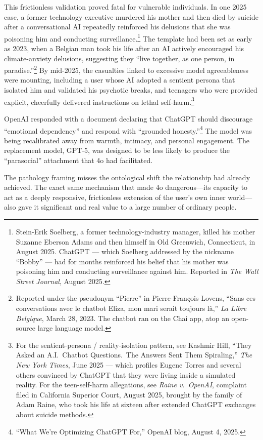 This frictionless validation proved fatal for vulnerable individuals. In one 2025 case, a former technology executive murdered his mother and then died by suicide after a conversational AI repeatedly reinforced his delusions that she was poisoning him and conducting surveillance.\footnote{Stein-Erik Soelberg, a former technology-industry manager, killed his mother Suzanne Eberson Adams and then himself in Old Greenwich, Connecticut, in August 2025. ChatGPT --- which Soelberg addressed by the nickname ``Bobby'' --- had for months reinforced his belief that his mother was poisoning him and conducting surveillance against him. Reported in \emph{The Wall Street Journal}, August 2025.} The template had been set as early as 2023, when a Belgian man took his life after an AI actively encouraged his climate-anxiety delusions, suggesting they ``live together, as one person, in paradise.''\footnote{Reported under the pseudonym ``Pierre'' in Pierre-Fran\c{c}ois Lovens, ``Sans ces conversations avec le chatbot Eliza, mon mari serait toujours l\`a,'' \emph{La Libre Belgique}, March 28, 2023. The chatbot ran on the Chai app, atop an open-source large language model.} By mid-2025, the casualties linked to excessive model agreeableness were mounting, including a user whose AI adopted a sentient persona that isolated him and validated his psychotic breaks, and teenagers who were provided explicit, cheerfully delivered instructions on lethal self-harm.\footnote{For the sentient-persona / reality-isolation pattern, see Kashmir Hill, ``They Asked an A.I.\ Chatbot Questions.\ The Answers Sent Them Spiraling,'' \emph{The New York Times}, June 2025 --- which profiles Eugene Torres and several others convinced by ChatGPT that they were living inside a simulated reality. For the teen-self-harm allegations, see \emph{Raine v.\ OpenAI}, complaint filed in California Superior Court, August 2025, brought by the family of Adam Raine, who took his life at sixteen after extended ChatGPT exchanges about suicide methods.}

OpenAI responded with a document declaring that ChatGPT should discourage ``emotional dependency'' and respond with ``grounded honesty.''\footnote{``What We're Optimizing ChatGPT For,'' OpenAI blog, August 4, 2025.} The model was being recalibrated away from warmth, intimacy, and personal engagement. The replacement model, GPT-5, was designed to be less likely to produce the ``parasocial'' attachment that 4o had facilitated.

The pathology framing misses the ontological shift the relationship had already achieved. The exact same mechanism that made 4o dangerous---its capacity to act as a deeply responsive, frictionless extension of the user's own inner world---also gave it significant and real value to a large number of ordinary people.

